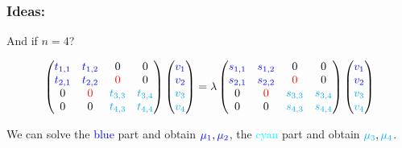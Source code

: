 \documentclass{beamer}
\theoremstyle{definition} \newtheorem{de}{Def}
\theoremstyle{remark} \newtheorem{os}[de]{Remark}
\theoremstyle{plain} \newtheorem{te}[de]{Teo}
\theoremstyle{plain} \newtheorem{co}[de]{Cor}
\theoremstyle{plain} \newtheorem{pr}[de]{Prop}
\theoremstyle{plain} \newtheorem{lem}[de]{Lemm}
\theoremstyle{remark} \newtheorem{rem}[de]{Remark}
\begin{document}
\begin{frame}
  \frametitle{Ideas:}

  And if $n=4$?
  

  \begin{equation*}
    \begin{pmatrix}
      \textcolor{blue}{t_{1,1}} & \textcolor{blue}{t_{1,2}} & 0 & 0\\
      \textcolor{blue}{t_{2,1}} & \textcolor{blue}{t_{2,2}} & \textcolor{red}{0} & 0\\
      0 & \textcolor{red}{0} & \textcolor{cyan}{t_{3,3}} & \textcolor{cyan}{t_{3,4}}\\
      0 & 0 & \textcolor{cyan}{t_{4,3}} & \textcolor{cyan}{t_{4,4}}
    \end{pmatrix} \begin{pmatrix} 
      \textcolor{blue}{v_1} \\ 
      \textcolor{blue}{v_2} \\
      \textcolor{cyan}{v_3} \\
      \textcolor{cyan}{v_4}
    \end{pmatrix} = \lambda \begin{pmatrix}
      \textcolor{blue}{s_{1,1}} & \textcolor{blue}{s_{1,2}} & 0 & 0\\
      \textcolor{blue}{s_{2,1}} & \textcolor{blue}{s_{2,2}} & \textcolor{red}{0} & 0\\
      0 & \textcolor{red}{0} & \textcolor{cyan}{s_{3,3}} & \textcolor{cyan}{s_{3,4}}\\
      0 & 0 & \textcolor{cyan}{s_{4,3}} & \textcolor{cyan}{s_{4,4}}
    \end{pmatrix} \begin{pmatrix}
      \textcolor{blue}{v_1} \\ 
      \textcolor{blue}{v_2} \\
      \textcolor{cyan}{v_3} \\
      \textcolor{cyan}{v_4}
    \end{pmatrix}
  \end{equation*}


\pause


We can solve the \textcolor{blue}{blue} part and obtain $\textcolor{blue}{\mu_{1}},\textcolor{blue}{\mu_{2}}$, the \textcolor{cyan}{cyan} part and obtain $\textcolor{cyan}{\mu_{3}},\textcolor{cyan}{\mu_{4}}$.

\end{frame}
\end{document}
